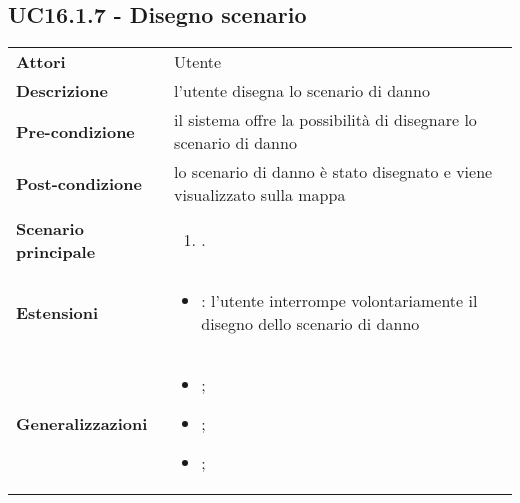 	\subsection{UC16.1.7 - Disegno scenario} 
\label{sssec:UC16.1.7} 
\def\arraystretch{1.5}
\begin{tabularx}{\textwidth}{l|p{}}
	\rowcolor{I} \multicolumn{2}{c}{\color{white}\textbf{UC16.1.7 - Disegno scenario}} \\
	\toprule
	\endhead
	\textbf{Attori} & Utente\\
	\textbf{Descrizione} & l'utente disegna lo scenario di danno\\
	\textbf{Pre-condizione} & il sistema offre la possibilità di disegnare lo scenario di danno\\
	\textbf{Post-condizione} & lo scenario di danno è stato disegnato e viene visualizzato sulla mappa\\
	\textbf{Scenario principale} & \vspace{-1.2em}\begin{enumerate}[leftmargin=*,noitemsep,nosep]
		\item \nameref{sssec:UC16.1.7}.
	\end{enumerate}\\
	\textbf{Estensioni} & \vspace{-1.2em}\begin{itemize}[leftmargin=*,noitemsep,nosep]
		\item \nameref{sssec:UC16.1.11}: l’utente interrompe volontariamente il disegno dello
		scenario di danno
	\end{itemize}\\
	\textbf{Generalizzazioni} &
	\vspace{-1.2em}\begin{itemize}
		[leftmargin=*,noitemsep,nosep]
		\item \nameref{sssec:UC16.1.8};
		\item \nameref{sssec:UC16.1.9};
		\item \nameref{sssec:UC16.1.10};
	\end{itemize} \\
	
	\bottomrule
\end{tabularx}
